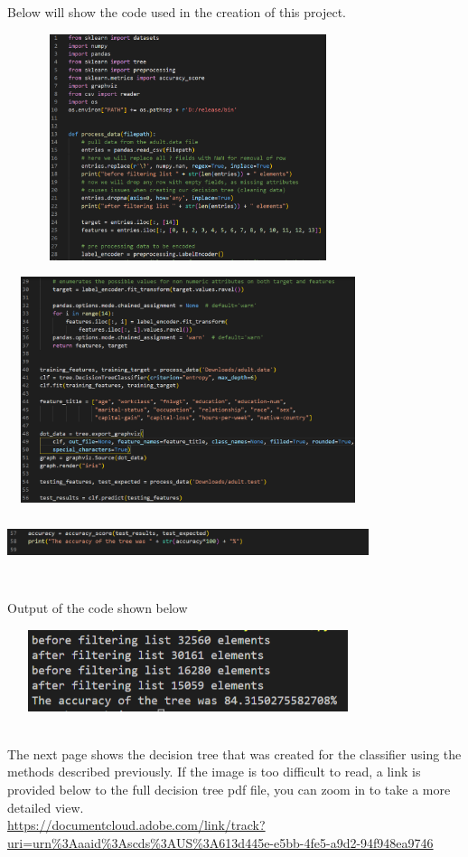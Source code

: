 \documentclass{article}
\begin{document}
Below will show the code used in the creation of this project.

\begin{center}
\includegraphics[width=400px,height=250px]{Screenshot_1.png}
\end{center}

\begin{center}
\includegraphics[width=400px,height=250px]{Screenshot_2.png}
\end{center}

\begin{center}
\includegraphics[width=400px,height=50px]{Screenshot_3.png}
\end{center}
\\
Output of the code shown below
\begin{center}
\includegraphics[width=400px,height=90px]{Screenshot_4.png}
\end{center}\\
The next page shows the decision tree that was created for the classifier using the methods described previously. If the image is too difficult to read, a link is provided below to the full decision tree pdf file, you can zoom in to take a more detailed view.\\
\href{https://documentcloud.adobe.com/link/track?uri=urn\%3Aaaid\%3Ascds\%3AUS\%3A613d445e-e5bb-4fe5-a9d2-94f948ea9746}{https://documentcloud.adobe.com/link/track?uri=urn\%3Aaaid\%3Ascds\%3AUS\%3A613d445e-e5bb-4fe5-a9d2-94f948ea9746}
\end{document}
